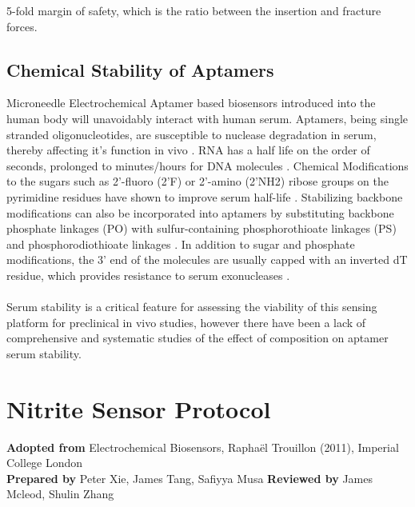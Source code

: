 \begin{appendices}
5-fold margin of safety, which  is the ratio between the insertion and fracture forces. 

\subsection{Chemical Stability of Aptamers}
Microneedle Electrochemical Aptamer based biosensors introduced into the human body will unavoidably interact with human serum. Aptamers, being single stranded oligonucleotides, are susceptible to nuclease degradation in serum, thereby affecting it's function in vivo \cite{kratschmer2017effect}. RNA has a half life on the order of seconds, prolonged to minutes/hours for DNA molecules \cite{morrissey2005activity,kurreck2002design}. Chemical Modifications to the sugars such as 2’-fluoro (2’F) or 2’-amino
(2’NH2) ribose groups on the pyrimidine residues have shown to improve serum half-life \cite{barciszewski2009locked}. Stabilizing backbone modifications can
also be incorporated into aptamers by substituting backbone phosphate linkages (PO) with sulfur-containing phosphorothioate
linkages (PS) \cite{green1995nuclease} and phosphorodiothioate linkages \cite{yang2004progress}. In addition to sugar and phosphate modifications, the 3’ end of the molecules are usually capped with an inverted
dT residue, which provides resistance to serum exonucleases \cite{dass2002cellular}.\\\\
 Serum stability is a critical feature for assessing the viability of this sensing platform for preclinical in vivo studies, however there have been a lack of comprehensive and systematic studies of the effect of composition
 on aptamer serum stability.

\newpage
\section{Nitrite Sensor Protocol} \label{app:nitrite_protocol}
\textbf{Adopted from} Electrochemical Biosensors, Raphaël Trouillon (2011), Imperial College London\\ \textbf{Prepared by} Peter Xie, James Tang, Safiyya Musa \quad  \textbf{Reviewed by} James Mcleod, Shulin Zhang

\end{appendices}

